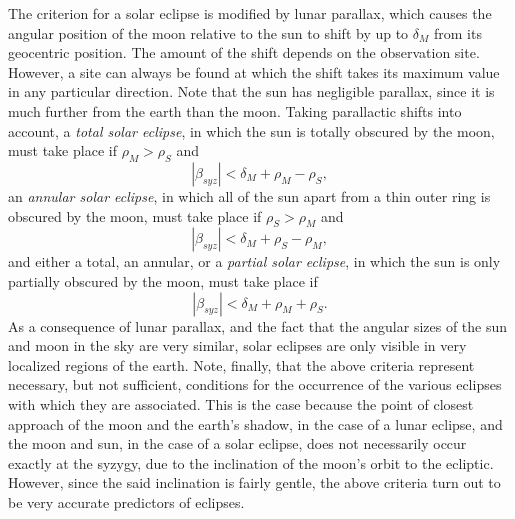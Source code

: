 The criterion for a solar eclipse is modified by lunar parallax, which causes the angular position of the moon relative to the sun to shift by up to $\delta_M$ from its geocentric position. The amount of the shift
 depends on the observation site. However, a site can always be found
 at which the shift takes its maximum value in any particular direction.
 Note that the sun has negligible parallax, since it is much further from the earth than the moon. Taking parallactic shifts into account, a {\em total solar eclipse}, in which the sun is totally obscured by the moon,
must take place if $\rho_M>\rho_S$ and
 \begin{equation}
 |\beta_{syz}| < \delta_M + \rho_M - \rho_S,
 \end{equation}
 an {\em annular solar eclipse}, in which all of the sun apart from
 a thin outer ring is obscured by the moon, must take place if
 $\rho_S>\rho_M$ and
 \begin{equation}
 |\beta_{syz}| < \delta_M +  \rho_S-\rho_M,
 \end{equation}
 and either a total, an annular,  or a {\em partial solar eclipse}, in which the
 sun is only partially obscured by the moon,  must take place if
 \begin{equation}
    |\beta_{syz}|< \delta_M + \rho_M + \rho_S.
  \end{equation}
As a consequence of lunar parallax, and the fact that the angular sizes of the sun and moon in the sky are very similar, solar eclipses are only visible in very localized regions of the earth. Note, finally, that the above criteria represent
necessary, but not sufficient, conditions for the occurrence of the various eclipses with which
they are associated. This is the case because the point of closest
approach of the moon and the earth's shadow, in the case of a
lunar eclipse, and the moon and sun, in the case of a solar eclipse, does
not necessarily occur exactly at the syzygy, due to the inclination
of the moon's orbit to the ecliptic. However, since the said inclination
is fairly gentle, the above criteria turn out to be very accurate
predictors of eclipses. 

